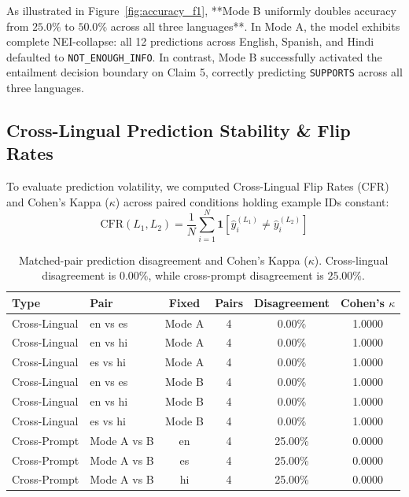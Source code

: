 \documentclass[10pt,twocolumn]{article}
\begin{document}
As illustrated in Figure~\ref{fig:accuracy_f1}, **Mode B uniformly doubles accuracy from $25.0\%$ to $50.0\%$ across all three languages**. In Mode A, the model exhibits complete NEI-collapse: all 12 predictions across English, Spanish, and Hindi defaulted to \texttt{NOT\_ENOUGH\_INFO}. In contrast, Mode B successfully activated the entailment decision boundary on Claim 5, correctly predicting \texttt{SUPPORTS} across all three languages.

\subsection{Cross-Lingual Prediction Stability & Flip Rates}
To evaluate prediction volatility, we computed Cross-Lingual Flip Rates (CFR) and Cohen's Kappa ($\kappa$) across paired conditions holding example IDs constant:
\begin{equation}
    \text{CFR}(L_1, L_2) = \frac{1}{N} \sum_{i=1}^N \mathbf{1}\left[\hat{y}_i^{(L_1)} \neq \hat{y}_i^{(L_2)}\right]
\end{equation}

\begin{table}[ht]
\centering
\small
\caption{Matched-pair prediction disagreement and Cohen's Kappa ($\kappa$). Cross-lingual disagreement is $0.00\%$, while cross-prompt disagreement is $25.00\%$.}
\label{tab:paired_disagree}
\begin{tabular}{llcccc}
\toprule
\textbf{Type} & \textbf{Pair} & \textbf{Fixed} & \textbf{Pairs} & \textbf{Disagreement} & \textbf{Cohen's $\kappa$} \\
\midrule
Cross-Lingual & en vs es & Mode A & 4 & 0.00\% & 1.0000 \\
Cross-Lingual & en vs hi & Mode A & 4 & 0.00\% & 1.0000 \\
Cross-Lingual & es vs hi & Mode A & 4 & 0.00\% & 1.0000 \\
Cross-Lingual & en vs es & Mode B & 4 & 0.00\% & 1.0000 \\
Cross-Lingual & en vs hi & Mode B & 4 & 0.00\% & 1.0000 \\
Cross-Lingual & es vs hi & Mode B & 4 & 0.00\% & 1.0000 \\
\midrule
Cross-Prompt & Mode A vs B & en & 4 & 25.00\% & 0.0000 \\
Cross-Prompt & Mode A vs B & es & 4 & 25.00\% & 0.0000 \\
Cross-Prompt & Mode A vs B & hi & 4 & 25.00\% & 0.0000 \\
\bottomrule
\end{tabular}
\end{table}
\end{document}
